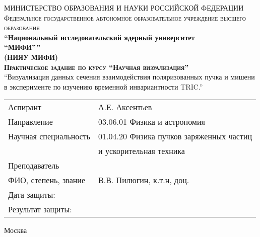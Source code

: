 \begin{titlepage}

\begin{center}
{МИНИСТЕРСТВО ОБРАЗОВАНИЯ И НАУКИ РОССИЙСКОЙ ФЕДЕРАЦИИ}\\[3pt]
\textsc{\small{Федеральное государственное автономное образовательное учреждение высшего образования}}\\

\textbf{\enquote{Национальный исследовательский ядерный университет\\
{``МИФИ''}}}\\
\textbf{(НИЯУ МИФИ)}\\[2cm]




\textsc{\textbf{Практическое задание по курсу ``Научная визуализация''}}\\[2cm]

\enquote{Визуализация данных сечения взаимодействия поляризованных пучка и мишени в эксперименте по изучению временной инвариантности TRIC.}\\[2cm]


\end{center}


\begin{flushleft}
\begin{tabular}{ll}
	Аспирант                   & А.Е. Аксентьев                           \\
	Направление                & 03.06.01 Физика и астрономия             \\
	Научная специальность      & 01.04.20 Физика пучков заряженных частиц \\
	                           & \-\hspace{1.8cm} и ускорительная техника \\[1cm]
	Преподаватель       &                                          \\
	ФИО, степень, звание & В.В. Пилюгин, к.т.н, доц.             \\[1cm]
	Дата защиты:               &                                          \\
	Результат защиты:          &
\end{tabular}

\end{flushleft}

\vfill


\begin{center}
Москва \the\year{}
\end{center}



\end{titlepage}